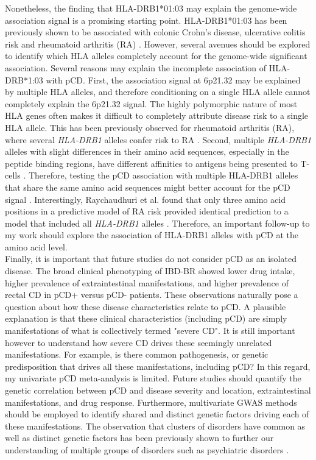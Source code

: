   Nonetheless, the finding that HLA-DRB1*01:03 may explain the genome-wide association signal is a promising starting point. HLA-DRB1*01:03 has been previously shown to be associated with colonic Crohn's disease, ulcerative colitis risk \cite{Goyette2015-xx,Cleynen2016-ha} and rheumatoid arthritis (RA) \cite{Klimenta2019-be}. However, several avenues should be explored to identify which HLA alleles completely account for the genome-wide significant association. Several reasons may explain the incomplete association of HLA-DRB*1:03 with pCD. First, the association signal at 6p21.32 may be explained by multiple HLA alleles, and therefore conditioning on a single HLA allele cannot completely explain the 6p21.32 signal. The highly polymorphic nature of most HLA genes often makes it difficult to completely attribute disease risk to a single HLA allele. This has been previously observed for rheumatoid arthritis (RA), where several \textit{HLA-DRB1} alleles confer risk to RA \cite{Van_Drongelen2017-dh}. Second, multiple \textit{HLA-DRB1} alleles with slight differences in their amino acid sequences, especially in the peptide binding regions, have different affinities to antigens being presented to T-cells \cite{Wang2022-hk}. Therefore, testing the pCD association with multiple HLA-DRB1 alleles that share the same amino acid sequences might better account for the pCD signal \cite{Molineros2019-mu}. Interestingly, Raychaudhuri et al. found that only three amino acid positions in a predictive model of RA risk provided identical prediction to a model that included all \textit{HLA-DRB1} alleles \cite{Raychaudhuri2012-em}. Therefore, an important follow-up to my work should explore the association of HLA-DRB1 alleles with pCD at the amino acid level. \\

Finally, it is important that future studies do not consider pCD as an isolated disease. The broad clinical phenotyping of IBD-BR showed lower drug intake, higher prevalence of extraintestinal manifestations, and higher prevalence of rectal CD in pCD+ versus pCD- patients. These observations naturally pose a question about how these disease characteristics relate to pCD. A plausible explanation is that these clinical characteristics (including pCD) are simply manifestations of what is collectively termed "severe CD". It is still important however to understand how severe CD drives these seemingly unrelated manifestations. For example, is there common pathogenesis, or genetic predisposition that drives all these manifestations, including pCD? In this regard, my univariate pCD meta-analysis is limited. Future studies should quantify the genetic correlation between pCD and disease severity and location, extraintestinal manifestations, and drug response. Furthermore, multivariate GWAS methods should be employed to identify shared and distinct genetic factors driving each of these manifestations. The observation that clusters of disorders have common as well as distinct genetic factors has been previously shown to further our understanding of multiple groups of disorders such as psychiatric disorders \cite{Grotzinger2019-bt}. \\





